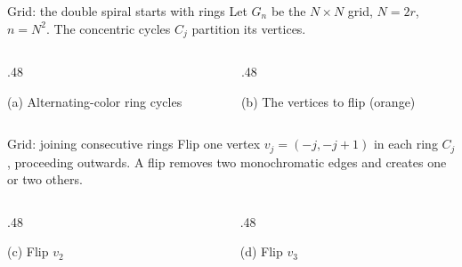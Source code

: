 \begin{frame}{Grid: the double spiral starts with rings}
 Let \(G_n\) be the \(N\times N\) grid, \(N=2r\), \(n=N^2\). The concentric cycles \(C_j\) partition its vertices.
 \begin{columns}[T,onlytextwidth]
  \begin{column}{.48\textwidth}
   \centering\resizebox{.70\linewidth}{!}{\SpiralFigA}
   \par\vspace{.08cm}\small (a) Alternating-color ring cycles
  \end{column}
  \begin{column}{.48\textwidth}
   \centering\resizebox{.70\linewidth}{!}{\SpiralFigB}
   \par\vspace{.08cm}\small (b) The vertices to flip (orange)
  \end{column}
 \end{columns}
\end{frame}


\begin{frame}{Grid: joining consecutive rings}
 Flip one vertex \(v_j=(-j,-j+1)\) in each ring \(C_j\), proceeding outwards. A flip removes two monochromatic edges and creates one or two others.
 \begin{columns}[T,onlytextwidth]
  \begin{column}{.48\textwidth}
   \centering\resizebox{.70\linewidth}{!}{\SpiralFigC}
   \par\vspace{.08cm}\small (c) Flip \(v_2\)
  \end{column}
  \begin{column}{.48\textwidth}
   \centering\resizebox{.70\linewidth}{!}{\SpiralFigD}
   \par\vspace{.08cm}\small (d) Flip \(v_3\)
  \end{column}
 \end{columns}
\end{frame}


